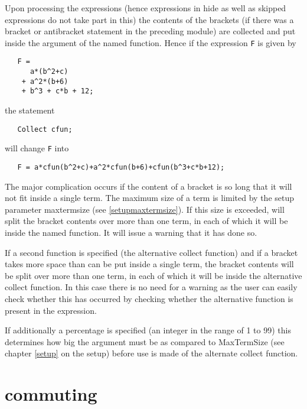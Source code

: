\noindent Upon processing the expressions (hence expressions 
in hide as well as skipped expressions do not take part in this) the 
contents of the brackets (if there was a bracket or 
antibracket statement in the preceding module) are 
collected and put inside the argument of the named function. Hence if the 
expression \verb:F: is given by
\begin{verbatim}
   F =
      a*(b^2+c)
    + a^2*(b+6)
    + b^3 + c*b + 12;
\end{verbatim}
the statement
\begin{verbatim}
   Collect cfun;
\end{verbatim}
will change \verb:F: into
\begin{verbatim}
   F = a*cfun(b^2+c)+a^2*cfun(b+6)+cfun(b^3+c*b+12);
\end{verbatim}
The major complication occurs if the content of a 
bracket is so long that it will not fit inside a single term. The maximum 
size of a term is limited by the setup parameter 
maxtermsize (see \ref{setupmaxtermsize}). If this size 
is exceeded, {\FORM} will split the bracket contents over more than one term, 
in each of which it will be inside the named function. It will issue a 
warning that it has done so. \vspace{4mm}

\noindent If a second function is specified (the 
alternative collect function) and if a bracket takes 
more space than can be put inside a single term, the bracket contents will 
be split over more than one term, in each of which it will be inside the 
alternative collect function. In this case there is no need for a 
warning 
as the user can easily check whether this has occurred by checking whether 
the alternative function is present in the expression. \vspace{4mm}

\noindent If additionally a percentage is specified (an 
integer in the range of 1 to 99) this determines how big the argument must 
be as compared to MaxTermSize (see chapter \ref{setup} on the setup) before 
use is made of the alternate collect function. \vspace{10mm}

 
\section{commuting}
\label{substacommuting}

